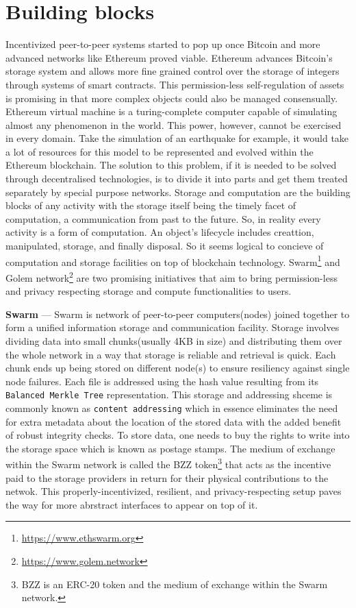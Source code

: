 \documentclass[a4paper, 10pt]{article}
\begin{document}
\section{Building blocks}
Incentivized peer-to-peer systems started to pop up once Bitcoin and more advanced networks like Ethereum proved viable. Ethereum advances Bitcoin's storage system and allows more fine grained control over the storage of integers through systems of smart contracts. This permission-less self-regulation of assets is promising in that more complex objects could also be managed consensually. Ethereum virtual machine is a turing-complete computer capable of simulating almost any phenomenon in the world. This power, however, cannot be exercised in every domain. Take the simulation of an earthquake for example, it would take a lot of resources for this model to be represented and evolved within the Ethereum blockchain. The solution to this problem, if it is needed to be solved through decentralised technologies, is to divide it into parts and get them treated separately by special purpose networks. Storage and computation are the building blocks of any activity with the storage itself being the timely facet of computation, a communication from past to the future\cite{Lampson:2006}. So, in reality every activity is a form of computation. An object's lifecycle includes creattion, manipulated, storage, and finally disposal. So it seems logical to concieve of computation and storage facilities on top of blockchain technology. Swarm\footnote{\url{https://www.ethswarm.org}} and Golem network\footnote{\url{https://www.golem.network}} are two promising initiatives that aim to bring permission-less and privacy respecting storage and compute functionalities to users.
\par
\textbf{Swarm} --- Swarm\cite{swarm:2021} is network of peer-to-peer computers(nodes) joined together to form a unified  information storage and communication facility. Storage involves dividing data into small chunks(usually 4KB in size) and distributing them over the whole network in a way that storage is reliable and retrieval is quick. Each chunk ends up being stored on different node(s) to ensure resiliency against single node failures. Each file is addressed using the hash value resulting from its \texttt{Balanced Merkle Tree} representation. This storage and addressing shceme is commonly known as \texttt{content addressing} which in essence eliminates the need for extra metadata about the location of the stored data with the added benefit of robust integrity checks. To store data, one needs to buy the rights to write into the storage space which is known as postage stamps. The medium of exchange within the Swarm network is called the BZZ token\footnote{BZZ is an ERC-20 token and the medium of exchange within the Swarm network.} that acts as the incentive paid to the storage providers in return for their physical contributions to the netwok. This properly-incentivized, resilient, and privacy-respecting setup paves the way for more abrstract interfaces to appear on top of it.
\end{document}
